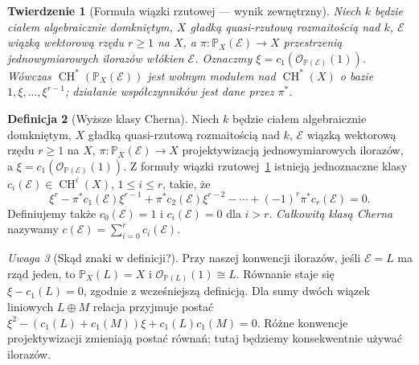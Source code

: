 \documentclass[11pt,a4paper,openany]{report}
\numberwithin{equation}{section}
\theoremstyle{plain}
\newtheorem{twierdzenie}{Twierdzenie}[section]
\theoremstyle{definition}
\newtheorem{definicja}[twierdzenie]{Definicja}
\theoremstyle{remark}
\newtheorem{uwaga}[twierdzenie]{Uwaga}
\newcommand{\PP}{\mathbb P}
\begin{document}
\begin{twierdzenie}[Formuła wiązki rzutowej — wynik zewnętrzny]
\label{tw:ga7-projective-bundle}
Niech $k$ będzie ciałem algebraicznie domkniętym,
$X$ gładką quasi-rzutową rozmaitością nad $k$,
$\mathcal E$ wiązką wektorową rzędu $r\ge1$ na $X$, a
$\pi:\PP_X(\mathcal E)\to X$ przestrzenią
jednowymiarowych ilorazów włókien $\mathcal E$.
Oznaczmy $\xi=c_1(\mathcal O_{\PP(\mathcal E)}(1))$.
Wówczas $\operatorname{CH}^*(\PP_X(\mathcal E))$ jest
wolnym modułem nad $\operatorname{CH}^*(X)$ o bazie
$1,\xi,\ldots,\xi^{r-1}$; działanie współczynników
jest dane przez $\pi^*$.
\end{twierdzenie}

\begin{definicja}[Wyższe klasy Cherna]
\label{def:ga7-c-classes}
Niech $k$ będzie ciałem algebraicznie domkniętym,
$X$ gładką quasi-rzutową rozmaitością nad $k$,
$\mathcal E$ wiązką wektorową rzędu $r\ge1$ na $X$,
$\pi:\PP_X(\mathcal E)\to X$ projektywizacją
jednowymiarowych ilorazów, a
$\xi=c_1(\mathcal O_{\PP(\mathcal E)}(1))$.
Z formuły wiązki rzutowej~\ref{tw:ga7-projective-bundle}
istnieją jednoznaczne klasy
$c_i(\mathcal E)\in\operatorname{CH}^i(X)$, $1\le i\le r$,
takie, że
\[
\xi^r-\pi^*c_1(\mathcal E)\xi^{r-1}
+\pi^*c_2(\mathcal E)\xi^{r-2}
-\cdots+(-1)^r\pi^*c_r(\mathcal E)=0.
\]
Definiujemy także $c_0(\mathcal E)=1$ i
$c_i(\mathcal E)=0$ dla $i>r$.
\emph{Całkowitą klasą Cherna} nazywamy
$c(\mathcal E)=\sum_{i=0}^r c_i(\mathcal E)$.
\end{definicja}

\begin{uwaga}[Skąd znaki w definicji?]
Przy naszej konwencji ilorazów, jeśli $\mathcal E=L$
ma rząd jeden, to $\PP_X(L)=X$ i
$\mathcal O_{\PP(L)}(1)\cong L$. Równanie staje się
$\xi-c_1(L)=0$, zgodnie z wcześniejszą definicją.
Dla sumy dwóch wiązek liniowych $L\oplus M$ relacja
przyjmuje postać
$\xi^2-(c_1(L)+c_1(M))\xi+c_1(L)c_1(M)=0$.
Różne konwencje projektywizacji zmieniają postać
równań; tutaj będziemy konsekwentnie używać ilorazów.
\end{uwaga}
\end{document}
